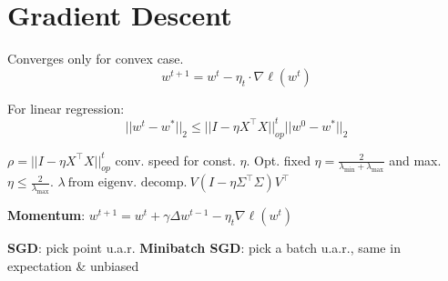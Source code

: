 \section*{Gradient Descent}
Converges only for convex case.
\[
	w^{t+1} = w^t - \eta_t \cdot \nabla \ell(w^t)
\]

For linear regression:
\[
	||w^t - w^*||_2 \leq ||I - \eta X^\top X||_{op}^t ||w^0 - w^*||_2
\]

$\rho = ||I - \eta X^\top X||_{op}^t$ conv. speed for const. $\eta$. Opt. fixed $\eta = \frac{2}
{\lambda_{\text{min}} + \lambda_{\text{max}}}$ and max. $\eta \leq \frac{2}{\lambda_{\text{max}}}$. 
$\lambda ~\text{from eigenv. decomp.} ~ V(I - \eta \Sigma^\top \Sigma)V^\top$

\textbf{Momentum}: $w^{t+1} = w^t + \gamma \Delta w^{t-1} - \eta_t \nabla \ell(w^t)$

\textbf{SGD}: pick point u.a.r.
\textbf{Minibatch SGD}: pick a batch u.a.r., same in expectation \& unbiased